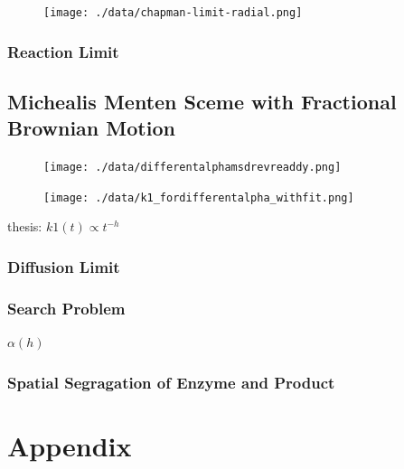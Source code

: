 \documentclass[
  a4paper,BCOR10mm,oneside,
  bibtotoc,idxtotoc,
  headsepline,footsepline,%
  fleqn,openbib
]{scrbook}
\begin{document}
\begin{figure}[h!]
  \centering
  \texttt{[image: ./data/chapman-limit-radial.png]}
  \captionsetup{width=\linewidth}
  \label{fig:diffusion_limit-Erban-Chapmann_radial}
\end{figure}
\newpage
\subsection{Reaction Limit}

\section{Michealis Menten Sceme with Fractional Brownian Motion}
\begin{figure}[h!]
  \centering
  \texttt{[image: ./data/differentalphamsdrevreaddy.png]}
  \captionsetup{width=\linewidth}
  \label{fig:differentalpharevreaddymsd}
\end{figure}

\begin{figure}[h!]
  \centering
  \texttt{[image: ./data/k1\_fordifferentalpha\_withfit.png]}
  \captionsetup{width=\linewidth}
  \label{fig:k1differentalphawithfit}
\end{figure}


thesis: $k1(t)\propto t^{-h}$
\subsection{Diffusion Limit}
\subsection{Search Problem}
$\alpha(h)$
\subsection{Spatial Segragation of Enzyme and Product}



\chapter{Appendix}
\end{document}
